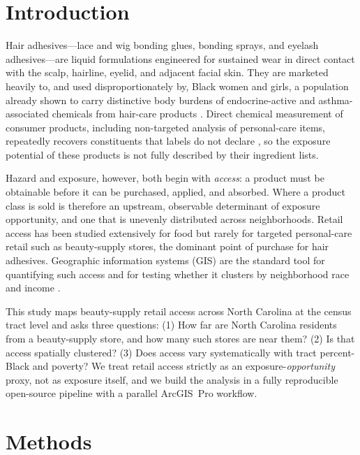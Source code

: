 \documentclass[12pt,letterpaper]{article}
\begin{document}
\section{Introduction}
\label{sec:intro}

Hair adhesives---lace and wig bonding glues, bonding sprays, and eyelash
adhesives---are liquid formulations engineered for sustained wear in direct
contact with the scalp, hairline, eyelid, and adjacent facial skin. They are
marketed heavily to, and used disproportionately by, Black women and
girls, a population already shown to carry distinctive body burdens of
endocrine-active and asthma-associated chemicals from hair-care products
\citep{helm2018,jamestodd2021,zota2017}. Direct chemical measurement of
consumer products, including non-targeted analysis of personal-care items,
repeatedly recovers constituents that labels do not declare
\citep{dodson2012,boatman2026}, so the exposure potential of these products is
not fully described by their ingredient lists.

Hazard and exposure, however, both begin with \emph{access}: a product must be
obtainable before it can be purchased, applied, and absorbed. Where a product
class is sold is therefore an upstream, observable determinant of exposure
opportunity, and one that is unevenly distributed across neighborhoods. Retail
access has been studied extensively for food \citep{walker2010} but rarely for
targeted personal-care retail such as beauty-supply stores, the dominant point
of purchase for hair adhesives. Geographic information systems (GIS) are the
standard tool for quantifying such access and for testing whether it clusters
by neighborhood race and income \citep{anselin1995,moran1950}.

This study maps beauty-supply retail access across North Carolina at the census
tract level and asks three questions: (1) How far are North Carolina residents
from a beauty-supply store, and how many such stores are near them? (2) Is that
access spatially clustered? (3) Does access vary systematically with tract
percent-Black and poverty? We treat retail access strictly as an
exposure-\emph{opportunity} proxy, not as exposure itself, and we build the
analysis in a fully reproducible open-source pipeline with a parallel ArcGIS~Pro
workflow.

\section{Methods}
\label{sec:methods}
\end{document}
